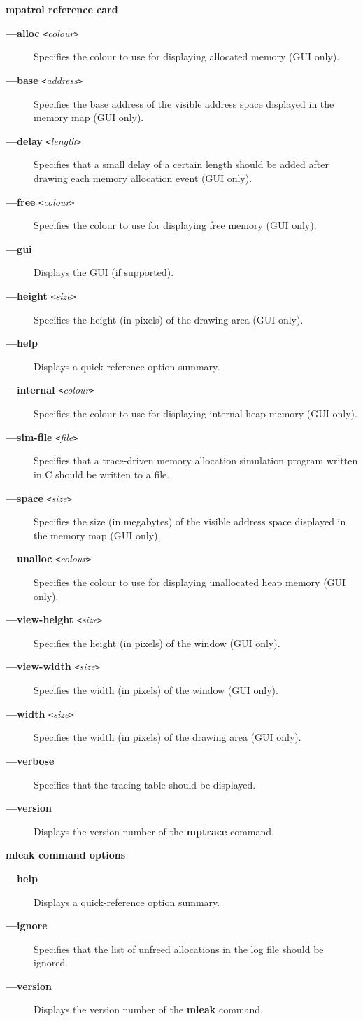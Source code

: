 \documentclass[a4paper,landscape,final]{article}
\newcommand{\heading}[1]{\textbf{\normalsize #1}}
\newcommand{\command}[1]{\textbf{#1}}
\newcommand{\flag}[1]{\textbf{---#1}}
\newcommand{\flagpar}[2]{\flag{#1} \texttt{<}\textit{#2}\texttt{>}}
\begin{document}
\begin{multicols}{3}{\textbf{\Large mpatrol reference card}}
\begin{description}
\item[\flagpar{alloc}{colour}]
Specifies the colour to use for displaying allocated memory (GUI only).
\item[\flagpar{base}{address}]
Specifies the base address of the visible address space displayed in the memory
map (GUI only).
\item[\flagpar{delay}{length}]
Specifies that a small delay of a certain length should be added after drawing
each memory allocation event (GUI only).
\item[\flagpar{free}{colour}]
Specifies the colour to use for displaying free memory (GUI only).
\item[\flag{gui}]
Displays the GUI (if supported).
\item[\flagpar{height}{size}]
Specifies the height (in pixels) of the drawing area (GUI only).
\item[\flag{help}]
Displays a quick-reference option summary.
\item[\flagpar{internal}{colour}]
Specifies the colour to use for displaying internal heap memory (GUI only).
\item[\flagpar{sim-file}{file}]
Specifies that a trace-driven memory allocation simulation program written in C
should be written to a file.
\item[\flagpar{space}{size}]
Specifies the size (in megabytes) of the visible address space displayed in the
memory map (GUI only).
\item[\flagpar{unalloc}{colour}]
Specifies the colour to use for displaying unallocated heap memory (GUI only).
\item[\flagpar{view-height}{size}]
Specifies the height (in pixels) of the window (GUI only).
\item[\flagpar{view-width}{size}]
Specifies the width (in pixels) of the window (GUI only).
\item[\flagpar{width}{size}]
Specifies the width (in pixels) of the drawing area (GUI only).
\item[\flag{verbose}]
Specifies that the tracing table should be displayed.
\item[\flag{version}]
Displays the version number of the \command{mptrace} command.
\end{description}

\vskip 12pt
\heading{mleak command options}
\vskip 6pt

\begin{description}
\item[\flag{help}]
Displays a quick-reference option summary.
\item[\flag{ignore}]
Specifies that the list of unfreed allocations in the log file should be
ignored.
\item[\flag{version}]
Displays the version number of the \command{mleak} command.
\end{description}


\end{multicols}
\end{document}
